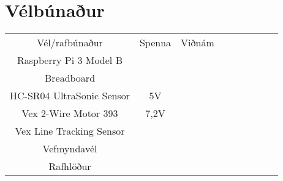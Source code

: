 \section{Vélbúnaður}
\begin{center}
\begin{tabular}{ |ccc|ccc|ccc| } 
 \hline
 Vél/rafbúnaður &Spenna &Viðnám\\ 
 Raspberry Pi 3 Model B & &\\ 
 Breadboard & & \\ 
 HC-SR04 UltraSonic Sensor & 5V & \\
 Vex 2-Wire Motor 393 & 7,2V & \\
 Vex Line Tracking Sensor & & \\ 
 Vefmyndavél & & \\ 
 Rafhlöður & & \\ 
 \hline
\end{tabular}
\end{center}